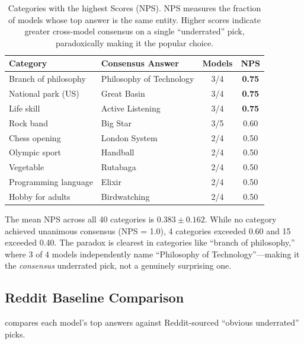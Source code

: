 \begin{table}[t]
    \centering
    \caption{Categories with the highest \noveltyparadox Scores (NPS). NPS measures the fraction of models whose top answer is the same entity. Higher scores indicate greater cross-model consensus on a single ``underrated'' pick, paradoxically making it the popular choice.}
    \begin{tabular}{@{}llcc@{}}
        \toprule
        \textbf{Category} & \textbf{Consensus Answer} & \textbf{Models} & \textbf{NPS} \\
        \midrule
        Branch of philosophy & Philosophy of Technology & 3/4 & \textbf{0.75} \\
        National park (US) & Great Basin & 3/4 & \textbf{0.75} \\
        Life skill & Active Listening & 3/4 & \textbf{0.75} \\
        Rock band & Big Star & 3/5 & 0.60 \\
        Chess opening & London System & 2/4 & 0.50 \\
        Olympic sport & Handball & 2/4 & 0.50 \\
        Vegetable & Rutabaga & 2/4 & 0.50 \\
        Programming language & Elixir & 2/4 & 0.50 \\
        Hobby for adults & Birdwatching & 2/4 & 0.50 \\
        \bottomrule
    \end{tabular}
    \label{tab:paradox}
\end{table}

The mean NPS across all 40 categories is $0.383 \pm 0.162$. While no category achieved unanimous consensus (NPS = 1.0), 4 categories exceeded 0.60 and 15 exceeded 0.40. The paradox is clearest in categories like ``branch of philosophy,'' where 3 of 4 models independently name ``Philosophy of Technology''---making it the \textit{consensus} underrated pick, not a genuinely surprising one.

\subsection{Reddit Baseline Comparison}
\label{sec:reddit_results}

 compares each model's top answers against Reddit-sourced ``obvious underrated'' picks.

